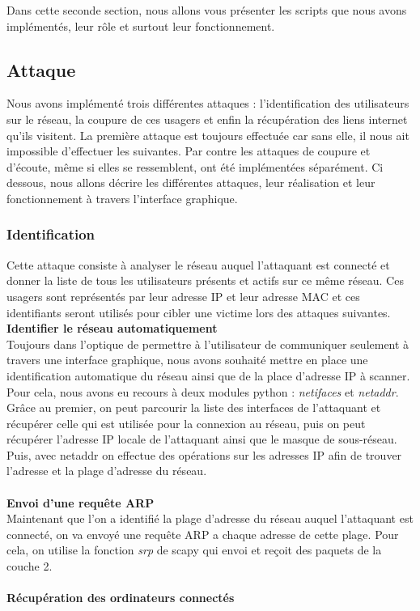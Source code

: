 \documentclass[11pt]{article}
\begin{document}
Dans cette seconde section, nous allons vous présenter les scripts que nous avons implémentés, leur rôle et surtout leur fonctionnement.
\subsection{Attaque}
Nous avons implémenté trois différentes attaques : l'identification des utilisateurs sur le réseau, la coupure de ces usagers et enfin la récupération des liens internet qu'ils visitent. La première attaque est toujours effectuée car sans elle, il nous ait impossible d'effectuer les suivantes. Par contre les attaques de coupure et d'écoute, même si elles se ressemblent, ont été implémentées séparément. Ci dessous, nous allons décrire les différentes attaques, leur réalisation et leur fonctionnement à travers l'interface graphique.
\subsubsection{Identification}
Cette attaque consiste à analyser le réseau auquel l'attaquant est connecté et donner la liste de tous les utilisateurs présents et actifs sur ce même réseau. Ces usagers sont représentés par leur adresse IP et leur adresse MAC et ces identifiants seront utilisés pour cibler une victime lors des attaques suivantes. ~\\

\textbf{Identifier le réseau automatiquement}~\\

Toujours dans l'optique de permettre à l'utilisateur de communiquer seulement à travers une interface graphique, nous avons souhaité mettre en place une identification automatique du réseau ainsi que de la place d'adresse IP à scanner. Pour cela, nous avons eu recours à deux modules python : \textit{netifaces} et \textit{netaddr}. Grâce au premier, on peut parcourir la liste des interfaces de l'attaquant et récupérer celle qui est utilisée pour la connexion au réseau, puis on peut récupérer l'adresse IP locale de l'attaquant ainsi que le masque de sous-réseau. Puis, avec netaddr on effectue des opérations sur les adresses IP afin de trouver l'adresse et la plage d'adresse du réseau. ~\\
~\\

\textbf{Envoi d'une requête ARP}~\\

Maintenant que l'on a identifié la plage d'adresse du réseau auquel l'attaquant est connecté, on va envoyé une requête ARP a chaque adresse de cette plage. Pour cela, on utilise la fonction \textit{srp} de scapy qui envoi et reçoit des paquets de la couche 2.~\\
~\\
\textbf{Récupération des ordinateurs connectés}~\\
\end{document}
